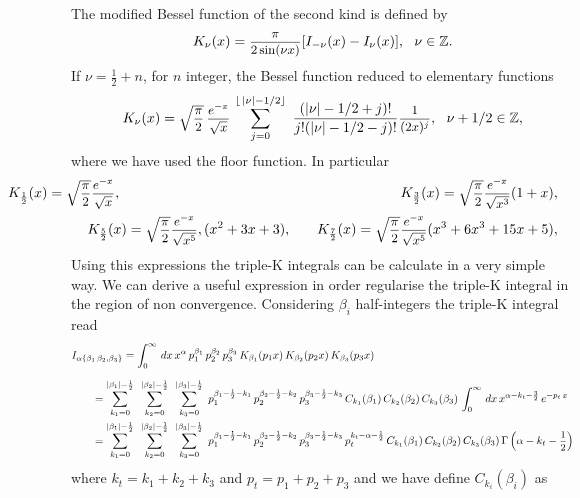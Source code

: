 \documentclass[a4paper,11pt,openright,twoside]{book}
\let\a=\alpha   \let\b=\beta   \let\g=\gamma   \let\d=\delta
\let\n=\nu      \let\x=\xi     \let\p=\pi      \let\r=\rho
\let\G=\Gamma  \let\D=\Delta \let\Q=\Theta  \let\L=\Lambda
\newcommand{\sdfrac}[2]{\mbox{\small$\displaystyle\frac{#1}{#2}$}}
\numberwithin{equation}{section}
\begin{document}
{{The modified Bessel function of the second kind is defined by
\begin{equation}
	K_\n(x)=\sdfrac{\pi}{2\sin(\n x)}[I_{-\n}(x)-I_{\n}(x)],\ \ \n\in\mathbb Z.
\end{equation}
If $\n=\frac{1}{2}+n$, for $n$ integer, the Bessel function reduced to elementary functions
\begin{equation}
	K_\n(x)=\sqrt{\sdfrac{\pi}{2}}\,\sdfrac{e^{-x}}{\sqrt{x}}\,\sum_{j=0}^{\lfloor\,|\n|-1/2\rfloor}\ \frac{(|\n|-1/2+j)!}{j!(|\n|-1/2-j)!}\sdfrac{1}{(2x)^j},\ \ \n+1/2\in\mathbb{Z},
\end{equation}
where we have used the floor function. In particular
\begin{eqnarray}
	&\hspace{-2cm}K_{\frac{1}{2}}(x)=\sqrt{\sdfrac{\pi}{2}}\sdfrac{e^{-x}}{\sqrt{x}},\quad &K_{\frac{3}{2}}(x)=\sqrt{\sdfrac{\pi}{2}}\sdfrac{e^{-x}}{\sqrt{x^3}}(1+x),\notag\\
	&K_{\frac{5}{2}}(x)=\sqrt{\sdfrac{\pi}{2}}\sdfrac{e^{-x}}{\sqrt{x^5}},(x^2+3x+3),\quad
	&K_{\frac{7}{2}}(x)=\sqrt{\sdfrac{\pi}{2}}\sdfrac{e^{-x}}{\sqrt{x^5}}(x^3+6x^3+15x+5),
\end{eqnarray}
Using this expressions the triple-K integrals can be calculate in a very simple way. We can derive a useful expression in order regularise the triple-K integral in the region of non convergence. Considering $\b_i$ half-integers the triple-K integral read
\begin{align}
	I_{\a\{\b_1\,\b_2,\b_3\}}&=\int_0^\infty\,dx\,x^\a\,p_1^{\b_1}\,p_2^{\b_2}\,p_3^{\b_3}\,K_{\b_1}(p_1x)\,K_{\b_2}(p_2x)\,K_{\b_3}(p_3x)\notag\\[1.5ex]
	&\hspace{-1cm}=\sum_{k_1=0}^{|\b_1|-\frac{1}{2}}\ \,\sum_{k_2=0}^{|\b_2|-\frac{1}{2}}\ \,\sum_{k_3=0}^{|\b_3|-\frac{1}{2}}\ p_1^{\b_1-\frac{1}{2}-k_1}\,p_2^{\b_2-\frac{1}{2}-k_2}\,p_3^{\b_3-\frac{1}{2}-k_3}\,C_{k_1}(\b_1)\,C_{k_2}(\b_2)\,C_{k_3}(\b_3)\,\int_0^\infty\,dx\,x^{\a-k_t-\frac{3}{2}}\,e^{-p_t\,x}\notag\\
	&\hspace{-1cm}=\sum_{k_1=0}^{|\b_1|-\frac{1}{2}}\ \,\sum_{k_2=0}^{|\b_2|-\frac{1}{2}}\ \,\sum_{k_3=0}^{|\b_3|-\frac{1}{2}}\ p_1^{\b_1-\frac{1}{2}-k_1}\,p_2^{\b_2-\frac{1}{2}-k_2}\,p_3^{\b_3-\frac{1}{2}-k_3}\,p_t^{k_t-\a-\frac{1}{2}}\,C_{k_1}(\b_1)\,C_{k_2}(\b_2)\,C_{k_3}(\b_3)\,\G\left(\a-k_t-\sdfrac{1}{2}\right)\label{halfinteg}
\end{align}
where $k_t=k_1+k_2+k_3$ and $p_t=p_1+p_2+p_3$ and we have define $C_{k_i}(\b_i)$ as
}}
\end{document}
